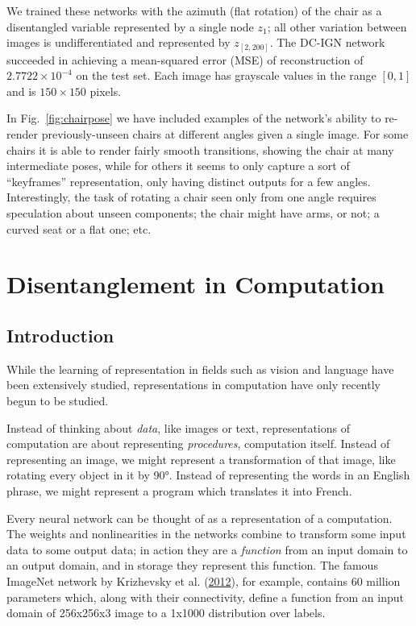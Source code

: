 \documentclass[12pt,twoside]{mitthesis}
\begin{document}
We trained these networks with the azimuth (flat rotation) of the chair
as a disentangled variable represented by a single node $z_1$; all
other variation between images is undifferentiated and represented by
$z_{[2,200]}$. The DC-IGN network succeeded in achieving a
mean-squared error (MSE) of reconstruction of $2.7722 \times 10^{-4}$
on the test set. Each image has grayscale values in the range $[0,1]$
and is $150 \times 150$ pixels.

In Fig.~\ref{fig:chairpose} we have included examples of the network's
ability to re-render previously-unseen chairs at different angles given
a single image. For some chairs it is able to render fairly smooth
transitions, showing the chair at many intermediate poses, while for
others it seems to only capture a sort of ``keyframes'' representation,
only having distinct outputs for a few angles. Interestingly, the task
of rotating a chair seen only from one angle requires speculation about
unseen components; the chair might have arms, or not; a curved seat or a
flat one; etc.

\chapter{Disentanglement in
Computation}\label{disentanglement-in-computation}

\section{Introduction}\label{introduction-2}

While the learning of representation in fields such as vision and
language have been extensively studied, representations in computation
have only recently begun to be studied.

Instead of thinking about \emph{data}, like images or text,
representations of computation are about representing \emph{procedures},
computation itself. Instead of representing an image, we might represent
a transformation of that image, like rotating every object in it by 90°.
Instead of representing the words in an English phrase, we might
represent a program which translates it into French.

Every neural network can be thought of as a representation of a
computation. The weights and nonlinearities in the networks combine to
transform some input data to some output data; in action they are a
\emph{function} from an input domain to an output domain, and in storage
they represent this function. The famous ImageNet network by Krizhevsky
et al. (\protect\hyperlink{ref-krizhevsky2012imagenet}{2012}), for
example, contains 60 million parameters which, along with their
connectivity, define a function from an input domain of 256x256x3 image
to a 1x1000 distribution over labels.
\end{document}
